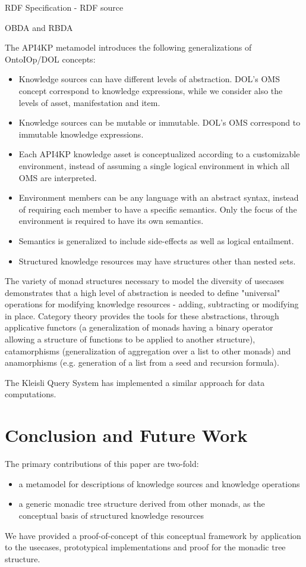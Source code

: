 \documentclass[runningheads]{llncs}
\begin{document}
RDF Specification - RDF source

OBDA and RBDA

The API4KP metamodel introduces the following generalizations of OntoIOp/DOL concepts:
\begin{itemize}
\item Knowledge sources can have different levels of abstraction. DOL's OMS concept correspond to knowledge expressions, while we consider also the levels of asset, manifestation and item.
\item Knowledge sources can be mutable or immutable. DOL's OMS correspond to immutable knowledge expressions.
\item Each API4KP knowledge asset is conceptualized according to a customizable environment, instead of assuming a single logical environment in which all OMS are interpreted.
\item Environment members can be any language with an abstract syntax, instead of requiring each member to have a specific semantics. Only the focus of the environment is required to have its own semantics.
\item Semantics is generalized to include side-effects as well as logical entailment.
\item Structured knowledge resources may have structures other than nested sets.
\end{itemize}

The variety of monad structures necessary to model the diversity of usecases demonstrates that a high level of abstraction is needed to define "universal" operations for modifying knowledge resources - adding, subtracting or modifying in place. Category theory provides the tools for these abstractions, through applicative functors (a generalization of monads having a binary operator allowing a structure of functions to be applied to another structure), catamorphisms (generalization of aggregation over a list to other monads) and anamorphisms (e.g. generation of a list from a seed and recursion formula).

The Kleisli Query System  has implemented a similar approach for data computations.

\section{Conclusion and Future Work}
\label{conc}
The primary contributions of this paper are two-fold:
\begin{itemize}
\item a metamodel for descriptions of knowledge sources and knowledge operations
\item a generic monadic tree structure derived from other monads, as the conceptual basis of structured knowledge resources
\end{itemize}
We have provided a proof-of-concept of this conceptual framework by application to the usecases, prototypical implementations and proof for the monadic tree structure.
\end{document}

